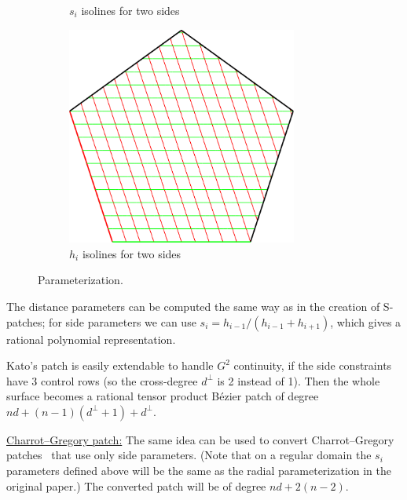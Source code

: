 \documentclass{article}
\begin{document}
\begin{figure}[b!]
\begin{subfigure}{0.30\textwidth}
\begin{minipage}[b][5cm][b]{\textwidth}
      \vspace*{9mm}
    \end{minipage}
    \caption{$s_i$ isolines for two sides}
    \label{fig:s}
  \end{subfigure}
  \hfill
  \begin{subfigure}{0.30\textwidth}
    \begin{minipage}[b][5cm][b]{\textwidth}
      \centering
      \includegraphics[width = 0.83\textwidth]{images/h-params.pdf}
      \vspace*{9mm}
    \end{minipage}
    \caption{$h_i$ isolines for two sides}
    \label{fig:h}
  \end{subfigure}
  \caption{Parameterization.}
  \label{fig:parameters}
\end{figure}

The distance parameters can be computed the same way as in the creation of S-patches; for side
parameters we can use $s_i=h_{i-1}/(h_{i-1}+h_{i+1})$, which gives a rational polynomial
representation.

Kato's patch is easily extendable to handle $G^2$ continuity, if the side constraints have 3
control rows (so the cross-degree $d^\perp$ is 2 instead of 1).
Then the whole surface becomes a rational tensor product B\'ezier patch of
degree $nd+(n-1)(d^\perp+1)+d^\perp$.

\vspace{10pt}
\noindent\underline{Charrot--Gregory patch:}\vspace{0.2em}\newline
The same idea can be used to convert Charrot--Gregory patches~\cite{charrot} that use
only side parameters. (Note that on a regular domain the $s_i$ parameters defined above
will be the same as the radial parameterization in the original paper.)
The converted patch will be of degree $nd+2(n-2)$.
\end{document}
